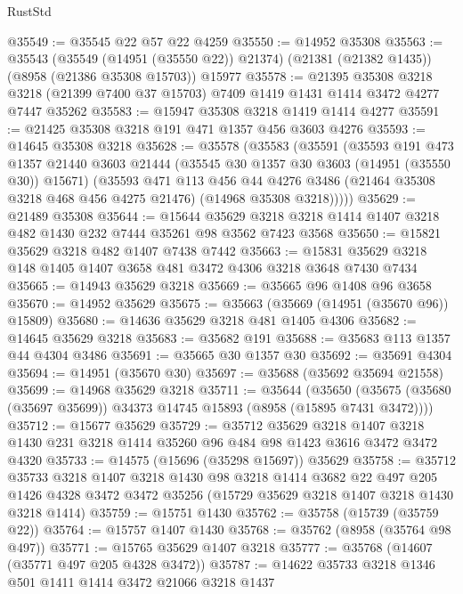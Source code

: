 \begin{lexlean}{RustStd}
\begin{coremodule}
@35549 := @35545 @22 @57 @22 @4259
@35550 := @14952 @35308
@35563 := @35543
    (@35549 (@14951 (@35550 @22)) @21374)
    (@21381 (@21382 @1435))
    (@8958 (@21386 @35308 @15703))
    @15977
@35578 := @21395
    @35308
    @3218
    @3218
    (@21399 @7400 @37 @15703)
    @7409
    @1419
    @1431
    @1414
    @3472
    @4277
    @7447
    @35262
@35583 := @15947 @35308 @3218 @1419 @1414 @4277
@35591 := @21425 @35308 @3218 @191 @471 @1357 @456 @3603 @4276
@35593 := @14645 @35308 @3218
@35628 := @35578
    (@35583
      (@35591
        (@35593
          @191
          @473
          @1357
          @21440
          @3603
          @21444
          (@35545 @30 @1357 @30 @3603 (@14951 (@35550 @30)) @15671)
          (@35593
            @471
            @113
            @456
            @44
            @4276
            @3486
            (@21464 @35308 @3218 @468 @456 @4275 @21476)
            (@14968 @35308 @3218)))))
@35629 := @21489 @35308
@35644 := @15644
    @35629
    @3218
    @3218
    @1414
    @1407
    @3218
    @482
    @1430
    @232
    @7444
    @35261
    @98
    @3562
    @7423
    @3568
@35650 := @15821 @35629 @3218 @482 @1407 @7438 @7442
@35663 := @15831 @35629 @3218 @148 @1405 @1407 @3658 @481 @3472 @4306 @3218 @3648 @7430 @7434
@35665 := @14943 @35629 @3218
@35669 := @35665 @96 @1408 @96 @3658
@35670 := @14952 @35629
@35675 := @35663 (@35669 (@14951 (@35670 @96)) @15809)
@35680 := @14636 @35629 @3218 @481 @1405 @4306
@35682 := @14645 @35629 @3218
@35683 := @35682 @191
@35688 := @35683 @113 @1357 @44 @4304 @3486
@35691 := @35665 @30 @1357 @30
@35692 := @35691 @4304
@35694 := @14951 (@35670 @30)
@35697 := @35688 (@35692 @35694 @21558)
@35699 := @14968 @35629 @3218
@35711 := @35644
    (@35650 (@35675 (@35680 (@35697 @35699)) @34373 @14745 @15893 (@8958 (@15895 @7431 @3472))))
@35712 := @15677 @35629
@35729 := @35712
    @35629
    @3218
    @1407
    @3218
    @1430
    @231
    @3218
    @1414
    @35260
    @96
    @484
    @98
    @1423
    @3616
    @3472
    @3472
    @4320
@35733 := @14575 (@15696 (@35298 @15697)) @35629
@35758 := @35712
    @35733
    @3218
    @1407
    @3218
    @1430
    @98
    @3218
    @1414
    @3682
    @22
    @497
    @205
    @1426
    @4328
    @3472
    @3472
    @35256
    (@15729 @35629 @3218 @1407 @3218 @1430 @3218 @1414)
@35759 := @15751 @1430
@35762 := @35758 (@15739 (@35759 @22))
@35764 := @15757 @1407 @1430
@35768 := @35762 (@8958 (@35764 @98 @497))
@35771 := @15765 @35629 @1407 @3218
@35777 := @35768 (@14607 (@35771 @497 @205 @4328 @3472))
@35787 := @14622 @35733 @3218 @1346 @501 @1411 @1414 @3472 @21066 @3218 @1437

\end{coremodule}
\end{lexlean}

